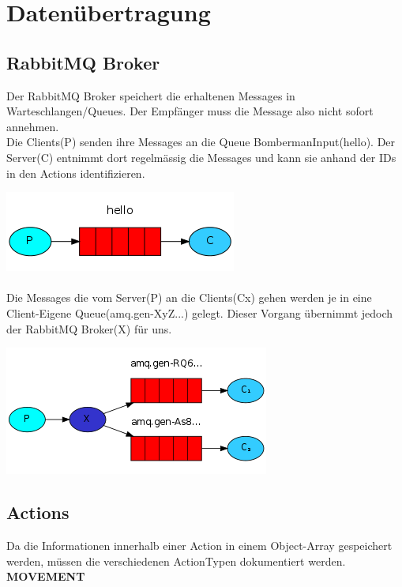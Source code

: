 \documentclass[11pt]{scrartcl}
\begin{document}
\section{Datenübertragung}
\subsection{RabbitMQ Broker}
Der RabbitMQ Broker speichert die erhaltenen Messages in Warteschlangen/Queues. Der Empfänger muss die Message also nicht sofort annehmen. \\
Die Clients(P) senden ihre Messages an die Queue BombermanInput(hello). Der Server(C) entnimmt dort regelmässig die Messages und kann sie anhand der IDs in den Actions identifizieren.

\includegraphics[scale=1.0]{clientToServer}\\\\

Die Messages die vom Server(P) an die Clients(Cx) gehen werden je in eine Client-Eigene Queue(amq.gen-XyZ...) gelegt. Dieser Vorgang übernimmt jedoch der RabbitMQ Broker(X) für uns.

\includegraphics[scale=1.0]{serverToClient}\\

\newpage

\subsection{Actions}
Da die Informationen innerhalb einer Action in einem Object-Array gespeichert werden, müssen die verschiedenen ActionTypen dokumentiert werden.\\

\textbf{MOVEMENT}\\
\end{document}
